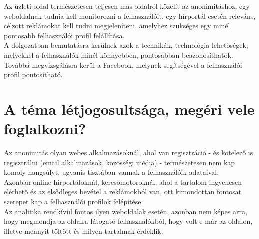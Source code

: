Az üzleti oldal természetesen teljesen más oldalról közelít az anonimitáshoz, egy weboldalnak tudnia kell monitorozni a felhasználóit, egy hírportál esetén releváns, célzott reklámokat kell tudni megjeleníteni, amelyhez szükséges egy minél pontosabb felhasználói profil felállítása.\\
A dolgozatban bemutatásra kerülnek azok a technikák, technológia lehetőségek, melyekkel a felhasználók minél könnyebben, pontosabban beazonosíthatók. Továbbá megvizsgálásra kerül a Facebook, melynek segítségével a felhasználói profil pontosítható.
\section{A téma létjogosultsága, megéri vele foglalkozni?} %
\label{sec:a_téma_létjogosultsága}
Az anonimitás olyan webes alkalmazásoknál, ahol van regisztráció - és kötelező is regisztrálni (email alkalmazások, közösségi média) - természetesen nem kap komoly hangsúlyt, ugyanis tisztában vannak a felhasználóik adataival.\\
Azonban online hírportáloknál, keresőmotoroknál, ahol a tartalom ingyenesen elérhető és az elsődleges bevétel a reklámokból van, ott kimondottan fontosat szerepet kap a felhasználói profilok felépítése.\\
Az analitika rendkívül fontos ilyen weboldalak esetén, azonban nem képes arra, hogy megmondja az oldalra látogató felhasználókból, hogy volt-e már az oldalon, illetve mennyit töltött és milyen tartalmak érdeklik.



